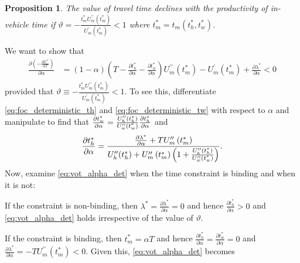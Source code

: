 \documentclass[12pt,a4paper,british]{article}
\makeatletter
\newenvironment{proof}[1][\proofname]{\par
    \normalfont\topsep6\p@\@plus6\p@\relax
    \trivlist
    \itemindent\parindent
    \item[\hskip\labelsep
          \scshape
      #1]\ignorespaces
  }{%
    \endtrivlist\@endpefalse
  }
\providecommand{\proofname}{Proof}
\newtheorem{prop}{Proposition}[section]
\makeatother
\begin{document}
\begin{prop}
The value of travel time declines with the productivity of in-vehicle time if $\vartheta = -\frac{t_{m}^{\ast} U_{m}^{\prime\prime} \left( t_{m}^{\ast} \right)} {U_{m}^{\prime}\left( t_{m}^{\ast} \right)}<1$ where $t_{m}^{\ast} = t_{m}\left(t_{h}^{\ast},t_{w}^{\ast}\right)$.
\end{prop}


\begin{proof}
We want to show that
\begin{align}
\frac{\partial\left(-\frac{\mathrm{d}U^{\ast}}{\mathrm{d}T}\right)}{\partial\alpha} & =\left(1-\alpha\right)\left(T-\frac{\partial t_{h}^{\ast}}{\partial\alpha} - \frac{\partial t_{w}^{\ast}}{\partial\alpha}\right)U_{m}^{\prime\prime}\left(t_{m}^{\ast}\right)-U_{m}^{\prime}\left(t_{m}^{\ast}\right)+\frac{\partial\lambda^{\ast}}{\partial\alpha} < 0
\label{eq:vot_alpha_det}
\end{align}
provided that $\vartheta\equiv-\frac{t_{m}^{\ast}U_{m}^{\prime\prime}\left(t_{m}^{\ast}\right)}{U_{m}^{\prime}\left(t_{m}^{\ast}\right)}<1$. To see this, differentiate \eqref{eq:foc_deterministic_th} and \eqref{eq:foc_deterministic_tw} with respect to $\alpha$ and manipulate to find that $\frac{\partial t_{w}^{\ast}}{\partial\alpha} = \frac{U_{h}^{\prime\prime} \text{\ensuremath{\left(t_{h}^{\ast}\right)}}}{U_{w}^{\prime\prime}\text{\ensuremath{\left(t_{w}^{\ast}\right)}}}\frac{\partial t_{h}^{\ast}}{\text{\ensuremath{\partial\alpha}}}$ and%
\begin{equation*}
\frac{\partial t_{h}^{\ast}}{\partial\alpha}=\frac{\frac{\partial\lambda^{\ast}}{\partial\alpha}+TU_{m}^{\prime\prime}\left(t_{m}^{\ast}\right)}{U_{h}^{\prime\prime}\text{\ensuremath{\left(t_{h}^{\ast}\right)}}+U_{m}^{\prime\prime}\left(t_{m}^{\ast}\right)\left(1+\frac{U_{h}^{\prime\prime}\text{\ensuremath{\left(t_{h}^{\ast}\right)}}}{U_{w}^{\prime\prime}\text{\ensuremath{\left(t_{w}^{\ast}\right)}}}\right)}.
\end{equation*}
Now, examine \eqref{eq:vot_alpha_det} when the time constraint is binding and when it is not:
\begin{casenv}
\item If the constraint is non-binding, then $\lambda^{\ast} = \frac{\partial\lambda^{\ast}}{\partial\alpha} = 0$ and hence $\frac{\partial t_{h}^{\ast}}{\partial\alpha}>0$ and \eqref{eq:vot_alpha_det} holds irrespective of the value of $\vartheta$.
\item If the constraint is binding, then $t_{m}^{\ast}=\alpha T$ and hence $\frac{\partial t_{h}^{\ast}}{\partial\alpha}=\frac{\partial t_{w}^{\ast}}{\partial\alpha}=0$ and $\frac{\partial\lambda^{\ast}}{\partial\alpha}=-TU_{m}^{\prime\prime}\left(t_{m}^{\ast}\right)<0$. Given this, \eqref{eq:vot_alpha_det} becomes%

\end{casenv}
\end{proof}
\end{document}
